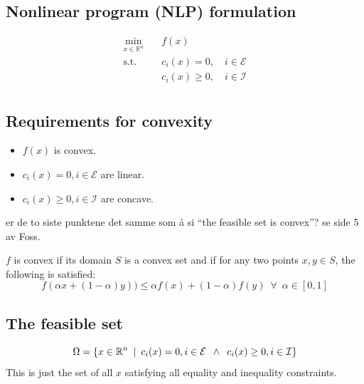 \documentclass[a4paper, 12pt]{article}
\newcommand{\comment}[1]{\textcolor{RedOrange}{#1}}
\theoremstyle{definition}
\newcommand{\Econ}{\mathcal{E}}
\newcommand{\Icon}{\mathcal{I}}
\newcommand{\enforall}{\enspace \forall \enspace}
\begin{document}
\subsection{Nonlinear program (NLP) formulation}
\begin{equation}\label{eq:general_problem}
	\begin{aligned}
		\underset{x \in \mathbb{R}^n}{\min}	& \quad f(x) \\
		\text{s.t.}	& \quad c_i(x)    = 0, \quad i \in \Econ \\
					& \quad c_i(x) \geq 0, \quad i \in \Icon \\
	\end{aligned}
\end{equation}

\subsection{Requirements for convexity}
\begin{itemize}
	\item \(f(x) \) is convex.
	\item \(c_i(x)    = 0, i \in \Econ\) are linear.
	\item \(c_i(x) \geq 0, i \in \Icon\) are concave.
\end{itemize}
\comment{er de to siste punktene det samme som å si ``the feasible set is convex''? se side 5 av Foss.}

\(f\) is convex if its domain \(S\) is a convex set and if for any two points \( x, y \in S \), the following is satisfied:
\begin{equation}
	f(\alpha x + (1-\alpha)y)) \leq \alpha f(x) + (1-\alpha) f(y) \enforall \alpha \in [0,1]
\end{equation}

\subsection{The feasible set}
\begin{equation}
	\Omega = \{x \in \mathbb{R}^n \enskip | \enskip c_i(x) = 0, i \in \Econ \enskip \land \enskip c_i(x) \geq 0, i \in \Icon\}
\end{equation}
This is just the set of all \(x\) satisfying all equality and inequality constraints.
\end{document}
